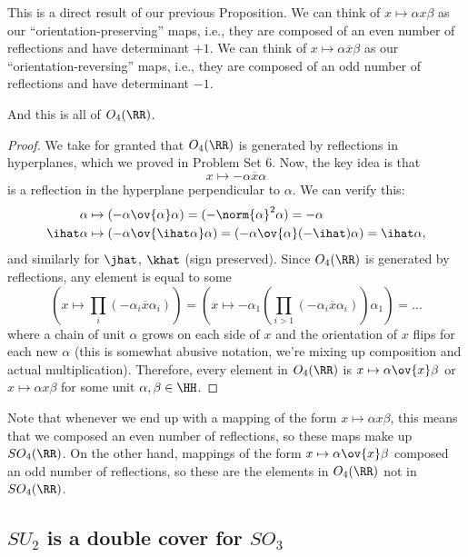 This is a direct result of our previous Proposition. We can think of $x\mapsto \alpha x\beta$ as our ``orientation-preserving'' maps, i.e., they are composed of an even number of reflections and have determinant $+1$. We can think of $x\mapsto \alpha\overline{x}\beta$ as our ``orientation-reversing'' maps, i.e., they are composed of an odd number of reflections and have determinant $-1$. 

\begin{theorem}
\thmlabel

And this is all of $O_4(\RR)$. 
\end{theorem}

\begin{proof}
We take for granted that $O_4(\RR)$ is generated by reflections in hyperplanes, which we proved in Problem Set $6$. Now, the key idea is that 
\[x\mapsto -\alpha\overline{x}\alpha\]
is a reflection in the hyperplane perpendicular to $\alpha$. We can verify this: 
\begin{align*}
    \alpha &\mapsto (-\alpha\ov{\alpha}\alpha) =  (-\norm{\alpha}^2\alpha) = -\alpha \\
    \ihat\alpha &\mapsto (-\alpha \ov{\ihat\alpha}\alpha) = (-\alpha\ov{\alpha}(-\ihat)\alpha) = \ihat\alpha,
\end{align*}
and similarly for $\jhat$, $\khat$ (sign preserved). Since $O_4(\RR)$ is generated by reflections, any element is equal to some
\[\left(x\mapsto \prod_{i}(-\alpha_i\overline{x}\alpha_i)\right) = \left(x\mapsto -\alpha_1\left(\prod_{i>1}(-\alpha_i\overline{x}\alpha_i)\right)\alpha_1\right) = \hdots\]
where a chain of unit $\alpha$ grows on each side of $x$ and the orientation of $x$ flips for each new $\alpha$ (this is somewhat abusive notation, we're mixing up composition and actual multiplication). Therefore, every element in $O_4(\RR)$ is $x\mapsto \alpha\ov{x}\beta$ or $x\mapsto \alpha x\beta$ for some unit $\alpha, \beta\in \HH$.
\end{proof}

Note that whenever we end up with a mapping of the form $x\mapsto \alpha x\beta$, this means that we composed an even number of reflections, so these maps make up $SO_4(\RR)$. On the other hand, mappings of the form $x\mapsto \alpha\ov{x}\beta$ composed an odd number of reflections, so these are the elements in $O_4(\RR)$ not in $SO_4(\RR)$.

\subsection{$SU_2$ is a double cover for $SO_3$}

